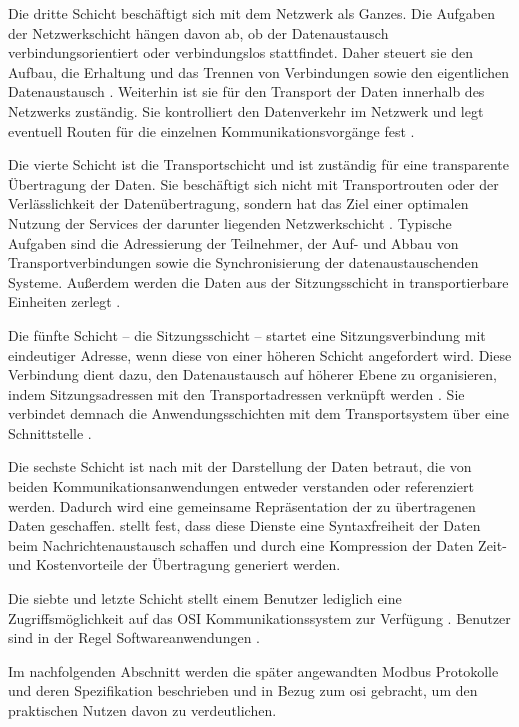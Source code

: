 Die dritte Schicht beschäftigt sich mit dem Netzwerk als Ganzes. Die Aufgaben der Netzwerkschicht hängen davon ab, ob der Datenaustausch  verbindungsorientiert oder verbindungslos stattfindet. Daher steuert sie den Aufbau, die Erhaltung und das Trennen von Verbindungen  sowie den eigentlichen Datenaustausch \cite[S.~41f.]{osi96}. Weiterhin ist sie für den Transport der Daten innerhalb des Netzwerks zuständig. Sie kontrolliert den Datenverkehr im Netzwerk und legt eventuell Routen für die einzelnen Kommunikationsvorgänge fest \cite[S.~11f.]{schn06}.

Die vierte Schicht ist die Transportschicht und ist zuständig für eine transparente Übertragung der Daten. Sie beschäftigt sich nicht mit Transportrouten oder der Verlässlichkeit der Datenübertragung, sondern hat das Ziel einer optimalen Nutzung der Services der darunter liegenden Netzwerkschicht \cite[S.~37f.]{osi96}.
Typische Aufgaben sind die Adressierung der Teilnehmer, der Auf- und Abbau von Transportverbindungen sowie die Synchronisierung der datenaustauschenden Systeme. Außerdem werden die Daten aus der Sitzungsschicht in transportierbare Einheiten zerlegt \cite[S.~12f.]{schn06}.

Die fünfte Schicht -- die Sitzungsschicht -- startet eine Sitzungsverbindung mit eindeutiger Adresse, wenn diese von einer höheren Schicht angefordert wird. Diese Verbindung dient dazu, den Datenaustausch auf höherer Ebene zu organisieren, indem Sitzungsadressen mit den Transportadressen verknüpft werden \cite[S.~35]{osi96}. Sie verbindet demnach die Anwendungsschichten mit dem Transportsystem über eine Schnittstelle \cite[S.~13]{schn06}.

Die sechste Schicht ist nach \cite[S.~33f.]{osi96} mit der Darstellung der Daten betraut, die von beiden Kommunikationsanwendungen entweder verstanden oder referenziert werden. Dadurch wird eine gemeinsame Repräsentation der zu übertragenen Daten geschaffen. \cite[S.~13f.]{schn06} stellt fest, dass diese Dienste eine Syntaxfreiheit der Daten beim Nachrichtenaustausch schaffen und durch eine Kompression der Daten Zeit- und Kostenvorteile der Übertragung generiert werden.

Die siebte und letzte Schicht stellt einem Benutzer lediglich eine Zugriffsmöglichkeit auf das OSI Kommunikationssystem zur Verfügung \cite[S.~32]{osi96}. Benutzer sind in der Regel Softwareanwendungen \cite[S.~14]{schn06}.

Im nachfolgenden Abschnitt werden die später angewandten Modbus Protokolle und deren Spezifikation beschrieben und in Bezug zum \acrshort{osi} gebracht, um den praktischen Nutzen davon zu verdeutlichen.


